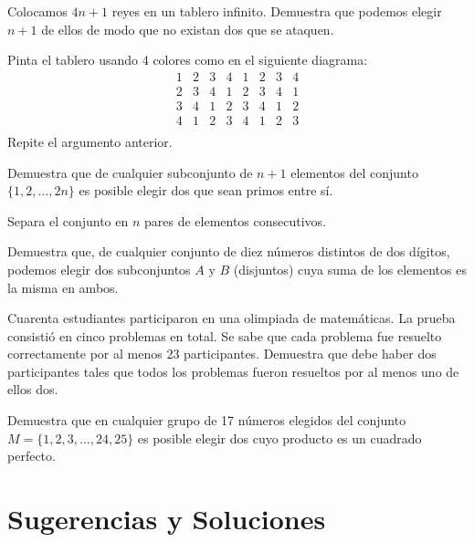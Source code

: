 \documentclass[11pt]{scrartcl}
\begin{document}
\begin{problem} Colocamos $4n + 1$ reyes en un tablero infinito. Demuestra que podemos elegir $n + 1$ de ellos de modo que no existan dos que se ataquen.
\begin{hint}
Pinta el tablero usando 4 colores como en el siguiente diagrama:
\[
\begin{matrix}
1 & 2 & 3 & 4 & 1 & 2 & 3 & 4 \\
2 & 3 & 4 & 1 & 2 & 3 & 4 & 1 \\
3 & 4 & 1 & 2 & 3 & 4 & 1 & 2 \\
4 & 1 & 2 & 3 & 4 & 1 & 2 & 3 \\
\end{matrix}
\]
Repite el argumento anterior.
\end{hint}
\end{problem}

\begin{problem}
Demuestra que de cualquier subconjunto de $n + 1$ elementos del conjunto $\{1, 2, \ldots, 2n\}$ es posible elegir dos que sean primos entre sí.
\begin{hint}
Separa el conjunto en \(n\) pares de elementos consecutivos.
\end{hint}
\end{problem}

\begin{problem}[IMO 1972] Demuestra que, de cualquier conjunto de diez números distintos de dos dígitos, podemos elegir dos subconjuntos $A$ y $B$ (disjuntos) cuya suma de los elementos es la misma en ambos.
\end{problem}

\begin{problem}
Cuarenta estudiantes participaron en una olimpiada de matemáticas. La prueba consistió en cinco problemas en total. Se sabe que cada problema fue resuelto correctamente por al menos 23 participantes. Demuestra que debe haber dos participantes tales que todos los problemas fueron resueltos por al menos uno de ellos dos.
\end{problem}

\begin{problem}
    Demuestra que en cualquier grupo de 17 números elegidos del conjunto $M = \{1, 2, 3, \ldots, 24, 25\}$ es posible elegir dos cuyo producto es un cuadrado perfecto.
\end{problem}

\section{Sugerencias y Soluciones}
\begin{enumerate}

\end{enumerate}
\end{document}
